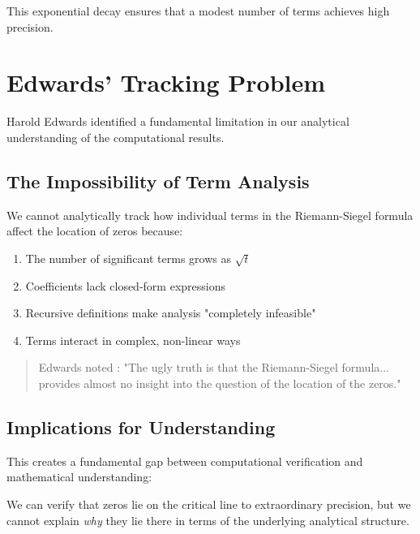 This exponential decay ensures that a modest number of terms achieves high precision.

\section{Edwards' Tracking Problem}
\label{sec:edwards-tracking}

Harold Edwards identified a fundamental limitation in our analytical understanding of the computational results.

\subsection{The Impossibility of Term Analysis}

\begin{problem}
We cannot analytically track how individual terms in the Riemann-Siegel formula affect the location of zeros because:
\begin{enumerate}
\item The number of significant terms grows as $\sqrt{t}$
\item Coefficients lack closed-form expressions  
\item Recursive definitions make analysis "completely infeasible"
\item Terms interact in complex, non-linear ways
\end{enumerate}
\end{problem}

\begin{quote}
Edwards noted \cite{edwards1974}: "The ugly truth is that the Riemann-Siegel formula... provides almost no insight into the question of the location of the zeros."
\end{quote}

\subsection{Implications for Understanding}

This creates a fundamental gap between computational verification and mathematical understanding:

\begin{remark}
We can verify that zeros lie on the critical line to extraordinary precision, but we cannot explain \textit{why} they lie there in terms of the underlying analytical structure.
\end{remark}

